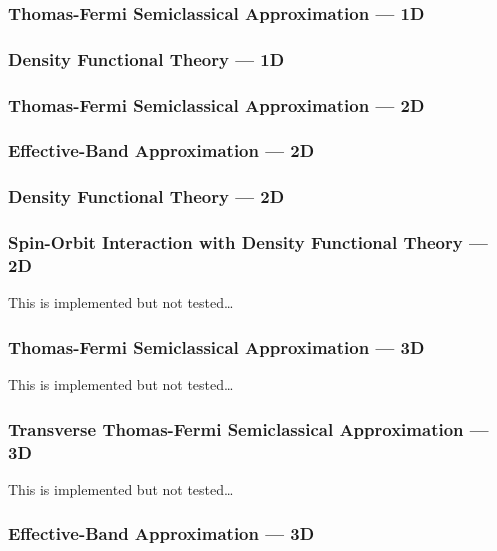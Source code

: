 \documentclass[12pt]{article}
\begin{document}
{\subsubsection{Thomas-Fermi Semiclassical Approximation --- 1D}



\subsubsection{Density Functional Theory --- 1D}

\subsubsection{Thomas-Fermi Semiclassical Approximation --- 2D}

\subsubsection{Effective-Band Approximation --- 2D}

\subsubsection{Density Functional Theory --- 2D}

\subsubsection{Spin-Orbit Interaction with Density Functional Theory --- 2D}

This is implemented but not tested\ldots

\subsubsection{Thomas-Fermi Semiclassical Approximation --- 3D}

This is implemented but not tested\ldots

\subsubsection{Transverse Thomas-Fermi Semiclassical Approximation --- 3D}

This is implemented but not tested\ldots

\subsubsection{Effective-Band Approximation --- 3D}

}
\end{document}
